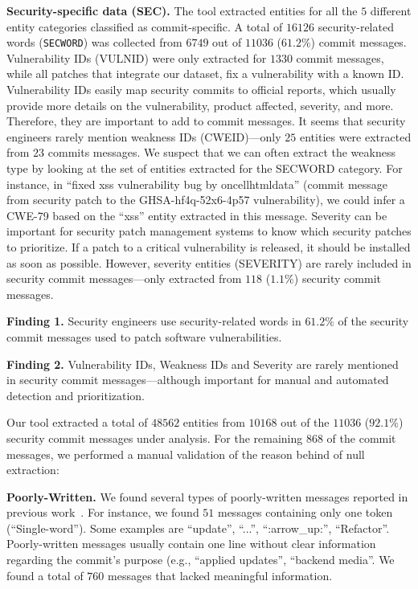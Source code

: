 \textbf{Security-specific data (SEC).} The tool extracted entities for all the $5$ different entity categories classified as commit-specific. A total of $16126$ security-related words (\texttt{SECWORD}) was collected from $6749$ out of $11036$ ($61.2\%$) commit messages.
Vulnerability IDs (VULNID) were only extracted for $1330$ commit messages, while all patches that integrate our dataset, fix a vulnerability with a known ID. Vulnerability IDs easily map security commits to official reports, which usually provide more details on the vulnerability, product affected, severity, and more. Therefore, they are important to add to commit messages.
It seems that security engineers rarely mention weakness IDs (CWEID)---only $25$ entities were extracted from $23$ commits messages. We suspect that we can often extract the weakness type by looking at the set of entities extracted for the SECWORD category. For instance, in ``fixed xss vulnerability bug by oncellhtmldata'' (commit message from security patch to the GHSA-hf4q-52x6-4p57 vulnerability), we could infer a CWE-79 based on the ``xss'' entity extracted in this message. Severity can be important for security patch management systems to know which security patches to prioritize. If a patch to a critical vulnerability is released, it should be installed as soon as possible. 
However, severity entities (SEVERITY) are rarely included in security commit messages---only extracted from $118$ ($1.1\%$) security commit messages.


\textbf{Finding 1.} Security engineers
use security-related words in
$61.2\%$ of the security commit messages
used to patch software vulnerabilities.



\textbf{Finding 2.} Vulnerability IDs, Weakness IDs and Severity are rarely mentioned 
in security commit messages---although important for manual and automated detection and prioritization. 

Our tool extracted
a total of $48562$ entities from $10168$ out of the $11036$ ($92.1\%$) security commit messages under analysis. For the remaining $868$ of the commit messages, we performed a manual validation of the reason behind of null extraction:

\textbf{Poorly-Written.} We found several types of poorly-written messages reported in previous work~\cite{Tian_2022}. For instance, we found $51$ messages containing only one token (``Single-word''). Some examples are ``update'', ``...'', ``:arrow\_up:'', ``Refactor''. Poorly-written messages usually contain one line without clear information regarding the commit’s purpose (e.g., ``applied updates'', ``backend media''. We found a total of $760$ messages that lacked meaningful information. 

